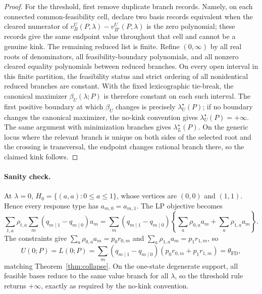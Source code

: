 \begin{proof}
For the threshold, first remove duplicate branch records. Namely, on each connected common-feasibility cell,
declare two basis records equivalent when the cleared numerator of
\(v_B^U(P,\lambda)-v_{B'}^U(P,\lambda)\) is the zero polynomial; these records give the same endpoint value
throughout that cell and cannot be a genuine kink. The remaining reduced list is finite. Refine
\((0,\infty)\) by all real roots of denominators, all feasibility-boundary polynomials, and all nonzero cleared
equality polynomials between reduced branches. On every open interval in this finite partition, the feasibility
status and strict ordering of all nonidentical reduced branches are constant. With the fixed lexicographic
tie-break, the canonical maximizer \(\beta_U(\lambda;P)\) is therefore constant on each such interval. The first
positive boundary at which \(\beta_U\) changes is precisely
\(\lambda_U^\star(P)\); if no boundary changes the canonical maximizer, the no-kink convention gives
\(\lambda_U^\star(P)=+\infty\). The same argument with minimization branches gives
\(\lambda_L^\star(P)\). On the generic locus where the relevant branch is unique on both sides of the selected
root and the crossing is transversal, the endpoint changes rational branch there, so the claimed kink follows.
\end{proof}

\paragraph{Sanity check.}
At \(\lambda=0\), \(H_0=\{(a,a):0\le a\le1\}\), whose vertices are \((0,0)\) and \((1,1)\). Hence every
response type has \(a_{m,0}=a_{m,1}\). The LP objective becomes
\[
  \sum_{t,a}\rho_{t,a}\sum_m(q_{m\mid1}-q_{m\mid0})a_m
  =\sum_m(q_{m\mid1}-q_{m\mid0})
    \left\{\sum_a\rho_{0,a}a_m+\sum_a\rho_{1,a}a_m\right\}.
\]
The constraints give
\(\sum_a\rho_{0,a}a_m=p_0r_{0,m}\) and
\(\sum_a\rho_{1,a}a_m=p_1r_{1,m}\), so
\[
  U(0;P)=L(0;P)
  =\sum_m(q_{m\mid1}-q_{m\mid0})(p_0r_{0,m}+p_1r_{1,m})
  =\theta_{\mathrm{FD}},
\]
matching Theorem~\ref{thm:collapse}. On the one-state degenerate support, all feasible bases reduce to the
same value branch for all \(\lambda\), so the threshold rule returns \(+\infty\), exactly as required by the
no-kink convention.

